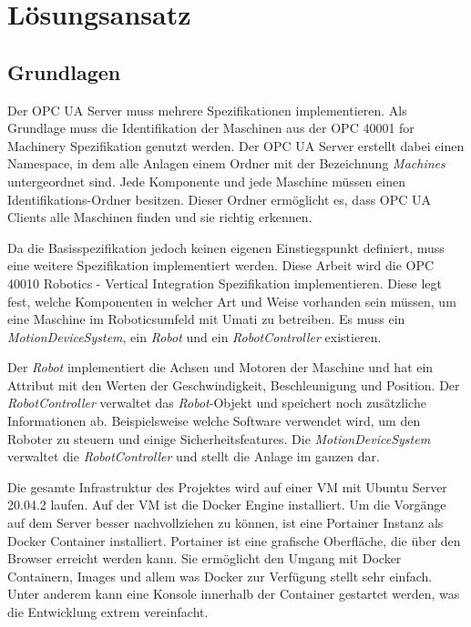 \documentclass[a4paper, 12pt, oneside, toc=listofnumbered, bibliography=totoc]{scrbook}
\begin{document}
	\section{Lösungsansatz}
	
		\subsection{Grundlagen}
		Der OPC UA Server muss mehrere Spezifikationen implementieren. Als Grundlage muss die Identifikation der Maschinen aus der OPC 40001 for Machinery Spezifikation genutzt werden. Der OPC UA Server erstellt dabei einen Namespace, in dem alle Anlagen einem Ordner mit der Bezeichnung \textit{Machines} untergeordnet sind. Jede Komponente und jede Maschine müssen einen Identifikations-Ordner besitzen. Dieser Ordner ermöglicht es, dass OPC UA Clients alle Maschinen finden und sie richtig erkennen. 
		
		Da die Basisspezifikation jedoch keinen eigenen Einstiegspunkt definiert, muss eine weitere Spezifikation implementiert werden. Diese Arbeit wird die OPC 40010 Robotics - Vertical Integration Spezifikation implementieren. Diese legt fest, welche Komponenten in welcher Art und Weise vorhanden sein müssen, um eine Maschine im Roboticsumfeld mit Umati zu betreiben. Es muss ein \textit{MotionDeviceSystem}, ein \textit{Robot} und ein \textit{RobotController} existieren. 
		
		Der \textit{Robot} implementiert die Achsen und Motoren der Maschine und hat ein Attribut mit den Werten der Geschwindigkeit, Beschleunigung und Position. Der \textit{RobotController} verwaltet das \textit{Robot}-Objekt und speichert noch zusätzliche Informationen ab. Beispielsweise welche Software verwendet wird, um den Roboter zu steuern und einige Sicherheitsfeatures. Die \textit{MotionDeviceSystem} verwaltet die \textit{RobotController} und stellt die Anlage im ganzen dar.
		
		Die gesamte Infrastruktur des Projektes wird auf einer VM mit Ubuntu Server 20.04.2 laufen. Auf der VM ist die Docker Engine installiert. Um die Vorgänge auf dem Server besser nachvollziehen zu können, ist eine Portainer Instanz als Docker Container installiert. Portainer ist eine grafische Oberfläche, die über den Browser erreicht werden kann. Sie ermöglicht den Umgang mit Docker Containern, Images und allem was Docker zur Verfügung stellt sehr einfach. Unter anderem kann eine Konsole innerhalb der Container gestartet werden, was die Entwicklung extrem vereinfacht. 
		
\end{document}
